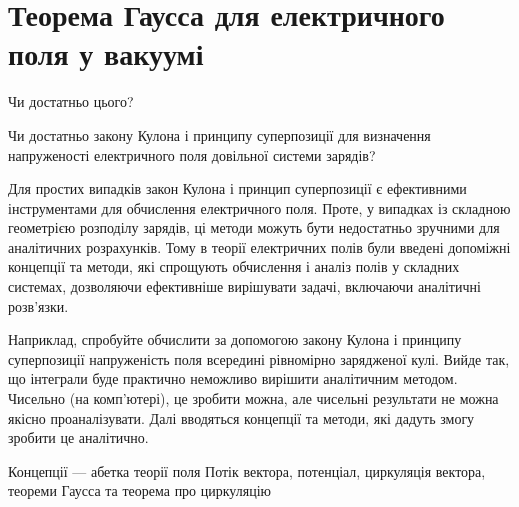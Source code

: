 \documentclass{beamer}
\begin{document}
\section{Теорема Гаусса для електричного поля у вакуумі}
\begin{frame}{Чи достатньо цього?}{}
	\begin{alertblock}{}\centering\small
		Чи достатньо закону Кулона і принципу суперпозиції для визначення
		напруженості електричного поля довільної системи зарядів?
	\end{alertblock}
	\begin{block}{}\justifying\small
		Для простих випадків \alert{закон Кулона} і \alert{принцип
			суперпозиції} є ефективними \alert{інструментами для обчислення
			електричного поля}. Проте, у випадках із складною геометрією розподілу
		зарядів, ці методи можуть бути недостатньо зручними для аналітичних
		розрахунків. Тому в теорії електричних полів були \alert{введені
			допоміжні концепції та методи}, які \alert{спрощують обчислення і
			аналіз} полів у складних системах, дозволяючи ефективніше вирішувати
		задачі, включаючи аналітичні розв’язки.
	\end{block}

	\begin{exampleblock}{}\justifying\scriptsize
		Наприклад, спробуйте обчислити за допомогою закону Кулона і принципу
		суперпозиції напруженість поля всередині рівномірно зарядженої кулі. Вийде
		так, що інтеграли буде практично неможливо вирішити аналітичним методом.
		Чисельно (на комп'ютері), це зробити можна, але чисельні результати не
		можна якісно проаналізувати. Далі вводяться концепції та методи, які
		дадуть змогу зробити це аналітично.
	\end{exampleblock}

	\begin{alertblock}{Концепції --- абетка теорії поля}\small
		Потік вектора, потенціал, циркуляція вектора, теореми Гаусса та теорема
		про циркуляцію
	\end{alertblock}
\end{frame}
\end{document}
